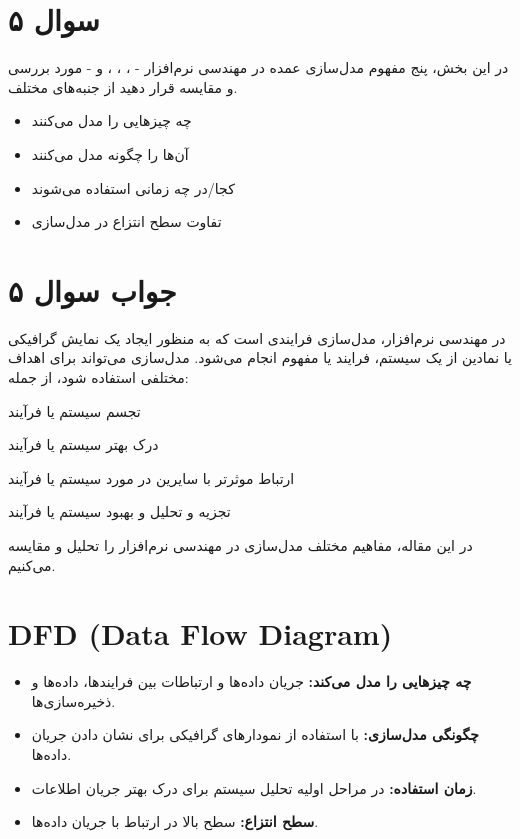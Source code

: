 \section*{سوال ۵}

در این بخش، پنج مفهوم مدل‌سازی عمده در مهندسی نرم‌افزار -
،
،
،
و
- مورد بررسی و مقایسه قرار دهید از جنبه‌های مختلف.

\begin{itemize}
	\item چه چیزهایی را مدل می‌کنند
	\item آن‌ها را چگونه مدل می‌کنند
	\item کجا/در چه زمانی استفاده می‌شوند
	\item تفاوت سطح انتزاع در مدل‌سازی
\end{itemize}

\section*{جواب سوال ۵}

در مهندسی نرم‌افزار، مدل‌سازی فرایندی است که به منظور ایجاد یک نمایش گرافیکی یا نمادین از یک سیستم، فرایند یا مفهوم انجام می‌شود. مدل‌سازی می‌تواند برای اهداف مختلفی استفاده شود، از جمله:

تجسم سیستم یا فرآیند

درک بهتر سیستم یا فرآیند

ارتباط موثرتر با سایرین در مورد سیستم یا فرآیند

تجزیه و تحلیل و بهبود سیستم یا فرآیند

در این مقاله، مفاهیم مختلف مدل‌سازی در مهندسی نرم‌افزار را تحلیل و مقایسه می‌کنیم.

\section*{DFD (Data Flow Diagram)}
\begin{itemize}
	\item \textbf{چه چیزهایی را مدل می‌کند:} جریان داده‌ها و ارتباطات بین فرایندها، داده‌ها و ذخیره‌سازی‌ها.
	\item \textbf{چگونگی مدل‌سازی:} با استفاده از نمودارهای گرافیکی برای نشان دادن جریان داده‌ها.
	\item \textbf{زمان استفاده:} در مراحل اولیه تحلیل سیستم برای درک بهتر جریان اطلاعات.
	\item \textbf{سطح انتزاع:} سطح بالا در ارتباط با جریان داده‌ها.
\end{itemize}

